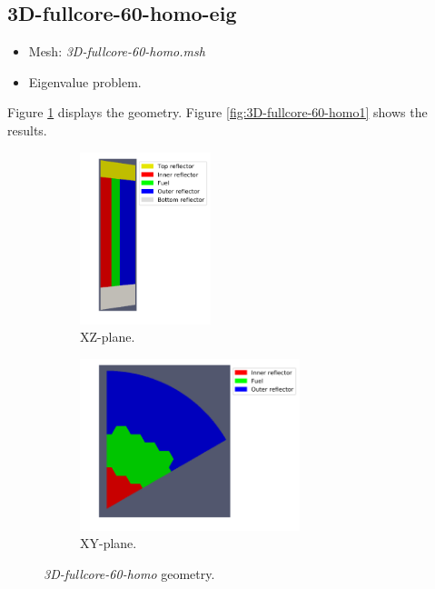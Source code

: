 \documentclass[11pt,letterpaper]{article}
\begin{document}
\subsection{3D-fullcore-60-homo-eig}

	\begin{itemize}
		\item Mesh: \textit{3D-fullcore-60-homo.msh}
		\item Eigenvalue problem.
	\end{itemize}

Figure \ref{fig:3D-fullcore-60-homo} displays the geometry.
Figure \ref{fig:3D-fullcore-60-homo1} shows the results.

	\begin{figure}[htbp!]
		\centering
		\begin{subfigure}[t]{0.4\textwidth}
			\centering
		\includegraphics[height=5cm]{3D-fullcore-60-homo-meshA2}
			\caption{XZ-plane.}
		\end{subfigure}
		\begin{subfigure}[t]{0.4\textwidth}
			\centering
		\includegraphics[height=5cm]{3D-fullcore-60-homo-meshB2}
			\caption{XY-plane.}
		\end{subfigure}
		\hfill
		\caption{\textit{3D-fullcore-60-homo} geometry.}
		\label{fig:3D-fullcore-60-homo}
	\end{figure}
\end{document}
